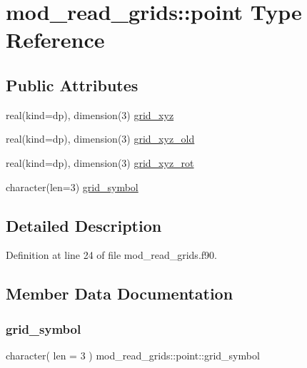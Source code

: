 \hypertarget{structmod__read__grids_1_1point}{}\section{mod\+\_\+read\+\_\+grids\+:\+:point Type Reference}
\label{structmod__read__grids_1_1point}
\subsection*{Public Attributes}
\begin{DoxyCompactItemize}
\item 
real(kind=dp), dimension(3) \hyperlink{structmod__read__grids_1_1point_a44e07983c85907248f16a1d5409902a8}{grid\+\_\+xyz}
\item 
real(kind=dp), dimension(3) \hyperlink{structmod__read__grids_1_1point_a010b9b432e70f8114e6ba80806abc995}{grid\+\_\+xyz\+\_\+old}
\item 
real(kind=dp), dimension(3) \hyperlink{structmod__read__grids_1_1point_ab0f3d5d60468a83f53e8f09bda7b17b3}{grid\+\_\+xyz\+\_\+rot}
\item 
character(len=3) \hyperlink{structmod__read__grids_1_1point_a4eddf2d1dd9848de549cb9e5a54aa333}{grid\+\_\+symbol}
\end{DoxyCompactItemize}


\subsection{Detailed Description}


Definition at line 24 of file mod\+\_\+read\+\_\+grids.\+f90.



\subsection{Member Data Documentation}
\mbox{\label{structmod__read__grids_1_1point_a4eddf2d1dd9848de549cb9e5a54aa333}} 
\subsubsection{\texorpdfstring{grid\+\_\+symbol}{grid\_symbol}}
{\footnotesize\ttfamily character( len = 3 ) mod\+\_\+read\+\_\+grids\+::point\+::grid\+\_\+symbol}



